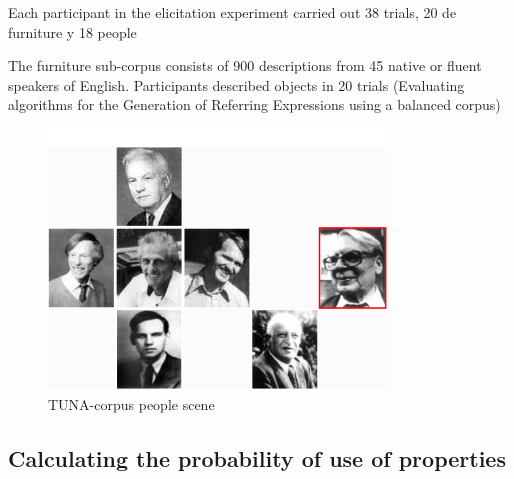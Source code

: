 Each participant in the elicitation experiment carried out 38 trials, 20 de furniture y 18 people 

The furniture sub-corpus consists of 900 descriptions from 45 native or fluent speakers of English.
Participants described objects in 20 trials (Evaluating algorithms for the Generation of Referring Expressions
using a balanced corpus)

\begin{figure}[ht]
\centering
\includegraphics[width=0.8\textwidth]{images/tuna-people.jpg}

\caption{TUNA-corpus people scene}
\label{Tuna-people-scene}
\centering

\end{figure}

\subsection{Calculating the probability of use of properties}\label{calculate}

